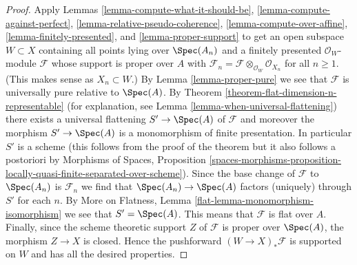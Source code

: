 \begin{proof}
Apply Lemmas \ref{lemma-compute-what-it-should-be},
\ref{lemma-compute-against-perfect},
\ref{lemma-relative-pseudo-coherence},
\ref{lemma-compute-over-affine},
\ref{lemma-finitely-presented}, and
\ref{lemma-proper-support}
to get an open subspace $W \subset X$ containing all points
lying over $\Spec(A_n)$
and a finitely presented $\mathcal{O}_W$-module $\mathcal{F}$
whose support is proper over $A$ with
$\mathcal{F}_n = \mathcal{F} \otimes_{\mathcal{O}_W} \mathcal{O}_{X_n}$
for all $n \geq 1$. (This makes sense as $X_n \subset W$.)
By Lemma \ref{lemma-proper-pure} we see that $\mathcal{F}$
is universally pure relative to $\Spec(A)$.
By Theorem \ref{theorem-flat-dimension-n-representable}
(for explanation, see Lemma \ref{lemma-when-universal-flattening})
there exists a universal flattening $S' \to \Spec(A)$
of $\mathcal{F}$ and moreover the morphism $S' \to \Spec(A)$
is a monomorphism of finite presentation.
In particular $S'$ is a scheme (this follows from the proof
of the theorem but it also follows a postoriori by
Morphisms of Spaces, Proposition
\ref{spaces-morphisms-proposition-locally-quasi-finite-separated-over-scheme}).
Since the base change of $\mathcal{F}$ to $\Spec(A_n)$
is $\mathcal{F}_n$ we find that $\Spec(A_n) \to \Spec(A)$
factors (uniquely) through $S'$ for each $n$.
By More on Flatness, Lemma \ref{flat-lemma-monomorphism-isomorphism}
we see that $S' = \Spec(A)$.
This means that $\mathcal{F}$ is flat over $A$.
Finally, since the scheme theoretic support $Z$ of $\mathcal{F}$
is proper over $\Spec(A)$, the morphism $Z \to X$ is closed.
Hence the pushforward $(W \to X)_*\mathcal{F}$ is supported
on $W$ and has all the desired properties.
\end{proof}















